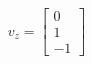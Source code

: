 \documentclass[preview]{standalone}
\begin{document}
\begin{align*}
v_z=\begin{bmatrix}
                        0\\
                        1\\
                        -1
                        \end{bmatrix}\\
\end{align*}
\end{document}
